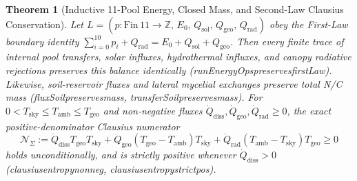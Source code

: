 \documentclass[11pt,a4paper]{article}
\numberwithin{equation}{section}
\theoremstyle{plain}
\newtheorem{theorem}{Theorem}[section]
\theoremstyle{definition}
\theoremstyle{remark}
\newcommand{\Z}{\mathbb{Z}}
\newcommand{\code}[1]{{\ttfamily\footnotesize\def\_{\textunderscore\penalty0\hskip0pt}#1}}
\begin{document}
\begin{theorem}[Inductive 11-Pool Energy, Closed Mass, and Second-Law Clausius Conservation]
\label{thm:energy}
Let $L = (p : \mathrm{Fin}\,11 \to \Z,\, E_0,\, Q_{\mathrm{sol}},\, Q_{\mathrm{geo}},\, Q_{\mathrm{rad}})$ obey the First-Law boundary identity $\sum_{i=0}^{10} p_i + Q_{\mathrm{rad}} = E_0 + Q_{\mathrm{sol}} + Q_{\mathrm{geo}}$. Then every finite trace of internal pool transfers, solar influxes, hydrothermal influxes, and canopy radiative rejections preserves this balance identically (\code{runEnergyOps\_preserves\_firstLaw}). Likewise, soil-reservoir fluxes and lateral mycelial exchanges preserve total N/C mass (\code{fluxSoil\_preserves\_mass}, \code{transferSoil\_preserves\_mass}). For $0 < T_{\mathrm{sky}} \le T_{\mathrm{amb}} \le T_{\mathrm{geo}}$ and non-negative fluxes $\dot Q_{\mathrm{diss}}, \dot Q_{\mathrm{geo}}, \dot Q_{\mathrm{rad}} \ge 0$, the exact positive-denominator Clausius numerator
\begin{equation}
  \mathcal{N}_{\dot\Sigma} := \dot Q_{\mathrm{diss}} T_{\mathrm{geo}} T_{\mathrm{sky}}
  + \dot Q_{\mathrm{geo}}(T_{\mathrm{geo}} - T_{\mathrm{amb}}) T_{\mathrm{sky}}
  + \dot Q_{\mathrm{rad}}(T_{\mathrm{amb}} - T_{\mathrm{sky}}) T_{\mathrm{geo}} \ge 0
  \label{eq:clausius}
\end{equation}
holds unconditionally, and is strictly positive whenever $\dot Q_{\mathrm{diss}} > 0$ (\code{clausius\_entropy\_nonneg}, \code{clausius\_entropy\_strict\_pos}).
\end{theorem}
\end{document}

